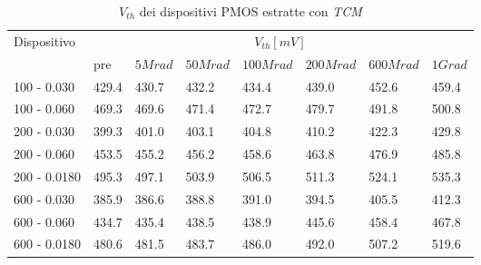 \documentclass[
	a4paper,
	cleardoublepage=empty,
	headings=twolinechapter,
	numbers=autoenddot,
]{scrbook}
\begin{document}
\begin{table}[H]
  \renewcommand{\arraystretch}{1.3}
  \begin{tabular}{m{2.1cm} m{0.8cm} m{1.1cm} m{1.3cm} m{1.5cm} m{1.5cm} m{1.5cm} m{1cm}}
    \toprule
    \multirow{2}{*}{Dispositivo} & \multicolumn{7}{c}{$V_{th} [mV] $}                                                                    \\
    \cmidrule{2-8}
                                 & pre                                & $5Mrad$ & $50Mrad$ & $100Mrad$ & $200Mrad$ & $600Mrad$ & $1Grad$ \\
    \midrule
    100 - 0.030                     & 429.4                              & 430.7   & 432.2    & 434.4     & 439.0     & 452.6     & 459.4   \\
    \hline
    100 - 0.060                     & 469.3                              & 469.6   & 471.4    & 472.7     & 479.7     & 491.8     & 500.8   \\
    \hline
    200 - 0.030                     & 399.3                              & 401.0   & 403.1    & 404.8     & 410.2     & 422.3     & 429.8   \\
    \hline
    200 - 0.060                     & 453.5                              & 455.2   & 456.2    & 458.6     & 463.8     & 476.9     & 485.8   \\
    \hline
    200 - 0.0180                    & 495.3                              & 497.1   & 503.9    & 506.5     & 511.3     & 524.1     & 535.3   \\
    \hline
    600 - 0.030                     & 385.9                              & 386.6   & 388.8    & 391.0     & 394.5     & 405.5     & 412.3   \\
    \hline
    600 - 0.060                     & 434.7                              & 435.4   & 438.5    & 438.9     & 445.6     & 458.4     & 467.8   \\
    \hline
    600 - 0.0180                    & 480.6                              & 481.5   & 483.7    & 486.0     & 492.0     & 507.2     & 519.6   \\
    \bottomrule
  \end{tabular}
  \caption{$V_{th}$ dei dispositivi PMOS estratte con \emph{TCM}}
  \label{tab:VthTCMP}
\end{table}
\end{document}
